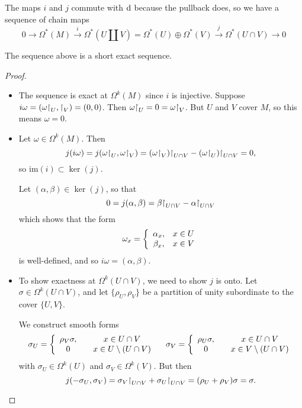 The maps $i$ and $j$ commute with $\mathop{}\!\mathrm{d}$ because the pullback does, so
we have a sequence of chain maps
$$
  0                                  \xrightarrow{}
  \Omega^\ast(M)                      \xrightarrow{i}
  \Omega^\ast(U \coprod V)
= \Omega^\ast(U) \oplus \Omega^\ast(V) \xrightarrow{j}
  \Omega^\ast(U \cap V)               \xrightarrow{}
  0
$$

\begin{prop}
The sequence above is a short exact sequence.
\end{prop}

\begin{proof}
\begin{itemize}
  \item{
    The sequence is exact at $\Omega^k(M)$ since $i$ is injective.
    Suppose $i\omega = (\omega\mathord{\upharpoonright}_U, \mathord{\upharpoonright}_V) = (0,
    0)$. Then $\omega\mathord{\upharpoonright}_U = 0 = \omega\mathord{\upharpoonright}_V$. But
    $U$ and $V$ cover $M$, so this means $\omega = 0$.
  }
  \item{
    Let $\omega \in \Omega^k(M)$. Then
    $$
      j(i \omega)
    = j(\omega\mathord{\upharpoonright}_U, \omega\mathord{\upharpoonright}_V)
    = (\omega\mathord{\upharpoonright}_V)\mathord{\upharpoonright}_{U \cap V}
    - (\omega\mathord{\upharpoonright}_U)\mathord{\upharpoonright}_{U \cap V}
    = 0,
    $$
    so $\mathrm{im}(i) \subset \ker(j)$.

    Let $(\alpha, \beta) \in \ker(j)$, so that
    $$
      0
    = j(\alpha, \beta)
    = \beta\mathord{\upharpoonright}_{U \cap V}
    - \alpha\mathord{\upharpoonright}_{U \cap V}
    $$
    which shows that the form
    $$
      \omega_x
    = \left\{
        \begin{array}{c c}
          \alpha_x, & x \in U \\
          \beta_x,  & x \in V
        \end{array}
      \right.
     $$
     is well-defined, and so $i \omega = (\alpha, \beta)$.
  }
  \item{
    To show exactness at $\Omega^k(U \cap V)$, we need to show
    $j$ is onto. Let $\sigma \in \Omega^k(U \cap V)$, and let
    $\{ \rho_U, \rho_V \}$ be a partition of unity subordinate to the
    cover $\{ U, V \}$.

    We construct smooth forms
    $$
      \sigma_U
    = \left\{
        \begin{array}{c c}
          \rho_V \sigma, & \quad x \in U \cap V \\
          0              & \quad x \in U \setminus (U \cap V)
        \end{array}
      \right. \quad
      \sigma_V
    = \left\{
        \begin{array}{c c}
          \rho_U \sigma, & \quad x \in U \cap V \\
          0              & \quad x \in V \setminus (U \cap V)
        \end{array}
      \right.
    $$
    with $\sigma_U \in \Omega^k(U)$ and
    $\sigma_V \in \Omega^k(V)$. But then
    $$
      j(-\sigma_U, \sigma_V)
    = \sigma_V \mathord{\upharpoonright}_{U \cap V}
    + \sigma_U \mathord{\upharpoonright}_{U \cap V}
    = (\rho_U + \rho_V)\sigma
    = \sigma.
    $$
  }
\end{itemize}
\end{proof}

